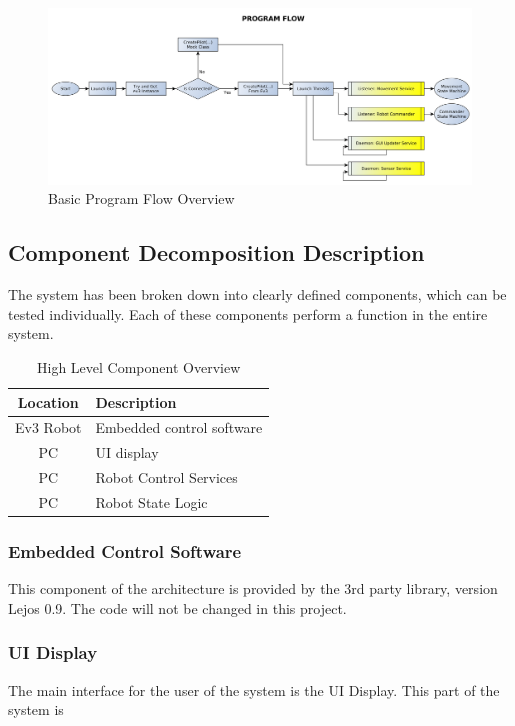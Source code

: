 \begin{figure}[H]
	\centering
	\includegraphics[width=\textwidth]{DiagramProgramFlow.png}
	\caption{\label{fig:flow1} Basic Program Flow Overview}
\end{figure}

\subsection{Component Decomposition Description}
The system has been broken down into clearly defined components, which can be tested individually. Each of these components perform a function in the entire system.

\begin{table}[H]
\centering
\begin{tabular}{|c|l|}
	\hline
	\bf{Location} & \bf{Description} \\
	\hline
	\hline
	Ev3 Robot & Embedded control software \\
	\hline
	PC & UI display \\
	\hline
	PC & Robot Control Services \\
	\hline
	PC & Robot State Logic \\
	\hline
\end{tabular}
\caption{\label{fig:compHigh}High Level Component Overview}
\end{table}

\subsubsection*{Embedded Control Software}
This component of the architecture is provided by the 3rd party library, version Lejos 0.9. The code will not be changed in this project.

\subsubsection*{UI Display}
The main interface for the user of the system is the UI Display. This part of the system is 

